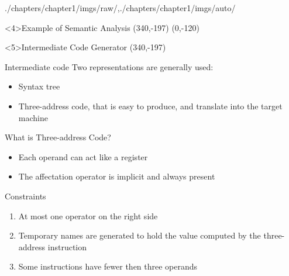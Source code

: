 \begin{graphicspathcontext}{{./chapters/chapter1/imgs/raw/},{./chapters/chapter1/imgs/auto/}}
\begin{bibunit}[apalike]
\begin{frame}<4>{Example of Semantic Analysis}
	\putat*(340,-197){}
	\putat(0,-120){}
\end{frame}

\begin{frame}<5>{{Intermediate Code} Generator}
	\putat*(340,-197){}
	\begin{minipage}{.8\linewidth}
		\vspace{1cm}
		\begin{block}{Intermediate code}
			Two representations are generally used: \begin{itemize}
				\item Syntax tree
				\item Three-address code, that is easy to produce, and translate into the target machine
			\end{itemize}
		\end{block}
	\end{minipage}
\end{frame}

\begin{frame}{{What is} Three-address Code?}
	\begin{itemize}
	\item Each operand can act like a register
	\item The affectation operator is implicit and always present
	\end{itemize}
	\begin{alertblock}{Constraints}
		\begin{enumerate}
			\item At most one operator on the right side
			\item Temporary names are generated to hold the value computed by the three-address instruction
			\item Some instructions have fewer then three operands
		\end{enumerate}
	\end{alertblock}
\end{frame}


\end{bibunit}
\end{graphicspathcontext}
